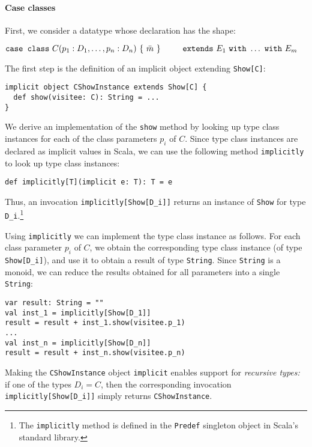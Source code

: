 \documentclass[preprint]{sigplanconf}
\begin{document}
\paragraph{Case classes} First, we consider a datatype whose declaration has the shape:

\begin{math}
\texttt{case class}~C(p_1: D_1, \ldots, p_n: D_n)~\{~\bar{m}~\} \\
\texttt{~~~~~extends}~E_1~\texttt{with}~ \ldots ~\texttt{with}~E_m
\end{math}

The first step is the definition of an implicit object extending
\verb|Show[C]|:

\begin{lstlisting}
implicit object CShowInstance extends Show[C] {
  def show(visitee: C): String = ...
}
\end{lstlisting}
\noindent
We derive an implementation of the \verb|show| method by looking up type class
instances for each of the class parameters $p_i$ of $C$. Since type class
instances are declared as implicit values in Scala, we can use the following
method \verb|implicitly| to look up type class instances:

\begin{lstlisting}
def implicitly[T](implicit e: T): T = e
\end{lstlisting}
\noindent
Thus, an invocation \verb|implicitly[Show[D_i]]| returns an instance of
\verb|Show| for type \verb|D_i|.\footnote{The \texttt{implicitly} method is
defined in the \texttt{Predef} singleton object in Scala's standard library.}

Using \verb|implicitly| we can implement the type class instance as follows.
For each class parameter $p_i$ of $C$, we obtain the corresponding type class
instance (of type \verb|Show[D_i]|), and use it to obtain a result of type
\verb|String|. Since \verb|String| is a monoid, we can reduce the results
obtained for all parameters into a single \verb|String|:

\begin{lstlisting}
var result: String = ""
val inst_1 = implicitly[Show[D_1]]
result = result + inst_1.show(visitee.p_1)
...
val inst_n = implicitly[Show[D_n]]
result = result + inst_n.show(visitee.p_n)
\end{lstlisting}
\noindent
Making the \verb|CShowInstance| object \verb|implicit| enables support for
\emph{recursive types:} if one of the types $D_i = C$, then the corresponding
invocation \verb|implicitly[Show[D_i]]| simply returns \verb|CShowInstance|.
\end{document}
